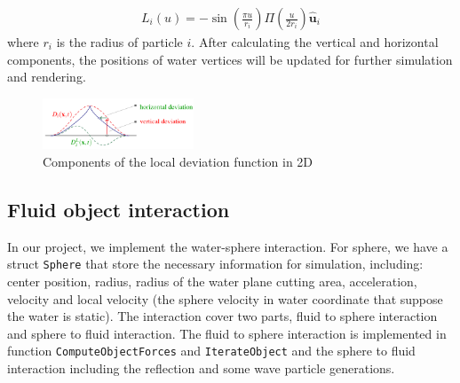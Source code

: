 \documentclass[acmtog]{acmart}
\begin{document}
\begin{equation*}
   \begin{aligned}
        L_i(u)=-\sin \left(\frac{\pi u}{r_i} \right) \Pi \left(\frac{u}{2r_i}\right)\hat{\mathbf{u}}_i
    \end{aligned}
\end{equation*}
where $r_{i}$ is the radius of particle $i$.
After calculating the vertical and horizontal components, the positions of water vertices will be updated for further simulation and rendering.
\begin{figure}[!htb]
  \centering
  \includegraphics[width=0.4\textwidth]{image/component.png}
  \caption{Components of the local deviation function in 2D} 
\label{fig:1}
\end{figure}
\subsection{Fluid object interaction}
In our project, we implement the water-sphere interaction. For sphere, we have a struct \verb|Sphere| that store the necessary information for simulation, including: center position, radius, radius of the water plane cutting area, acceleration, velocity and local velocity (the sphere velocity in water coordinate that suppose the water is static). 
The interaction cover two parts, fluid to sphere interaction and sphere to fluid interaction. The fluid to sphere interaction is implemented in function \verb|ComputeObjectForces| and \verb|IterateObject| and the sphere to fluid interaction including the reflection and some wave particle generations.
\end{document}
